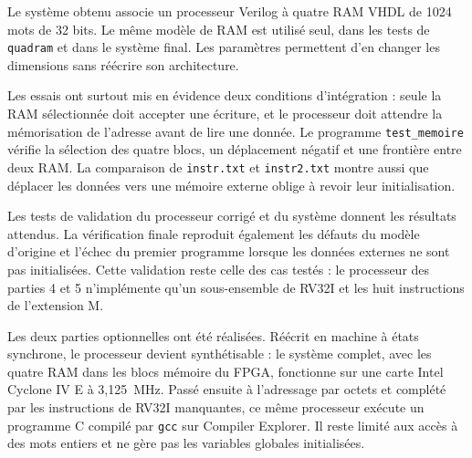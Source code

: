 
Le système obtenu associe un processeur Verilog à quatre RAM VHDL de 1024 mots de 32 bits.
Le même modèle de RAM est utilisé seul, dans les tests de \texttt{quadram} et dans le
système final. Les paramètres permettent d'en changer les dimensions sans réécrire son
architecture.

Les essais ont surtout mis en évidence deux conditions d'intégration : seule la RAM
sélectionnée doit accepter une écriture, et le processeur doit attendre la mémorisation
de l'adresse avant de lire une donnée. Le programme \texttt{test\_memoire} vérifie la
sélection des quatre blocs, un déplacement négatif et une frontière entre deux RAM.
La comparaison de \texttt{instr.txt} et \texttt{instr2.txt} montre aussi que déplacer les
données vers une mémoire externe oblige à revoir leur initialisation.

Les tests de validation du processeur corrigé et du système donnent les résultats attendus.
La vérification finale reproduit également les défauts du modèle d'origine et l'échec du
premier programme lorsque les données externes ne sont pas initialisées. Cette validation
reste celle des cas testés : le processeur des parties 4 et 5 n'implémente qu'un
sous-ensemble de RV32I et les huit instructions de l'extension M.

Les deux parties optionnelles ont été réalisées. Réécrit en machine à états synchrone, le
processeur devient synthétisable : le système complet, avec les quatre RAM dans les blocs
mémoire du FPGA, fonctionne sur une carte Intel Cyclone IV E à 3,125~MHz. Passé ensuite à
l'adressage par octets et complété par les instructions de RV32I manquantes, ce même
processeur exécute un programme C compilé par \texttt{gcc} sur Compiler Explorer. Il reste
limité aux accès à des mots entiers et ne gère pas les variables globales initialisées.
